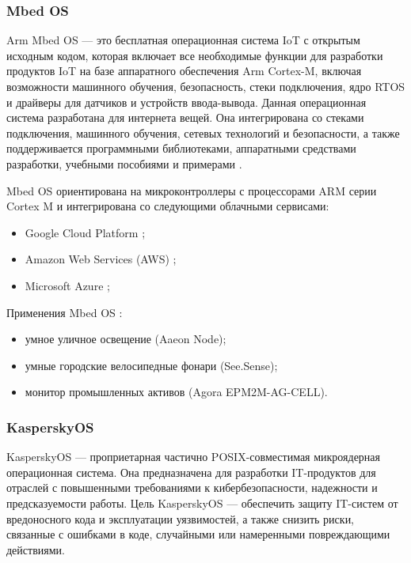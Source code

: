 \subsubsection{Mbed OS}

Arm Mbed OS \cite{Mbed_OS_ARM} --- это бесплатная операционная система IoT с открытым исходным кодом, которая включает все необходимые функции для разработки продуктов IoT на базе аппаратного обеспечения Arm Cortex-M, включая возможности машинного обучения, безопасность, стеки подключения, ядро RTOS и драйверы для датчиков и устройств ввода-вывода. Данная операционная система разработана для интернета вещей. Она интегрирована со стеками подключения, машинного обучения, сетевых технологий и безопасности, а также поддерживается программными библиотеками, аппаратными средствами разработки, учебными пособиями и примерами \cite{Mbed_OS_handbook}.

Mbed OS ориентирована на микроконтроллеры с процессорами ARM серии Cortex M и интегрирована со следующими облачными сервисами:

\begin{itemize}[label*=---]
	\item Google Cloud Platform \cite{Google_Cloud};
	\item Amazon Web Services (AWS) \cite{AWS};
	\item Microsoft Azure \cite{Azure_cloud};
\end{itemize}

Применения Mbed OS \cite{Mbed_OS_main}:

\begin{itemize}[label*=---]
	\item умное уличное освещение (Aaeon Node);
	\item умные городские велосипедные фонари (See.Sense);
	\item монитор промышленных активов (Agora EPM2M-AG-CELL).
\end{itemize}



\subsubsection{KasperskyOS}

KasperskyOS \cite{KasperskyOS_main} --- проприетарная частично POSIX-совместимая микроядерная операционная система. Она предназначена для разработки IT-продуктов для отраслей с повышенными требованиями к кибербезопасности, надежности и предсказуемости работы. Цель KasperskyOS --- обеспечить защиту IT-систем от вредоносного кода и эксплуатации уязвимостей, а также снизить риски, связанные с ошибками в коде, случайными или намеренными повреждающими действиями.

